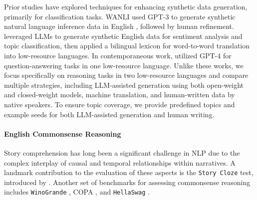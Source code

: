 
Prior studies have explored techniques for enhancing synthetic data generation, primarily for classification tasks. WANLI \citep{liu-etal-2022-wanli} used GPT-3 \citep{brown2020language} to generate synthetic natural language inference data in English \cite{bowman-etal-2015-large}, followed by human refinement. \citet{yong-etal-2024-lexc} leveraged LLMs to generate synthetic English data for sentiment analysis and topic classification, then applied a bilingual lexicon for word-to-word translation into low-resource languages. 
In contemporaneous work, \citet{putri-etal-2024-llm} utilized GPT-4 \cite{openai2024gpt4technicalreport} for question-answering tasks in one low-resource language. Unlike these works, we focus specifically on reasoning tasks in two low-resource languages and compare multiple strategies, including LLM-assisted generation using both open-weight and closed-weight models, machine translation, and human-written data by native speakers. To ensure topic coverage, we provide predefined topics and example seeds for both LLM-assisted generation and human writing.



\paragraph{English Commonsense Reasoning} 
Story comprehension has long been a significant challenge in NLP due to the complex interplay of causal and temporal relationships within narratives. A landmark contribution to the evaluation of these aspects is the \texttt{Story Cloze} test, introduced by \citet{mostafazadeh-etal-2016-corpus, mostafazadeh-etal-2017-lsdsem}. Another set of benchmarks for assessing commonsense reasoning includes \texttt{WinoGrande} \cite{sakaguchi2021winogrande}, COPA \citep{gordon-etal-2012-semeval}, and \texttt{HellaSwag} \citep{zellers-etal-2019-hellaswag}. 

